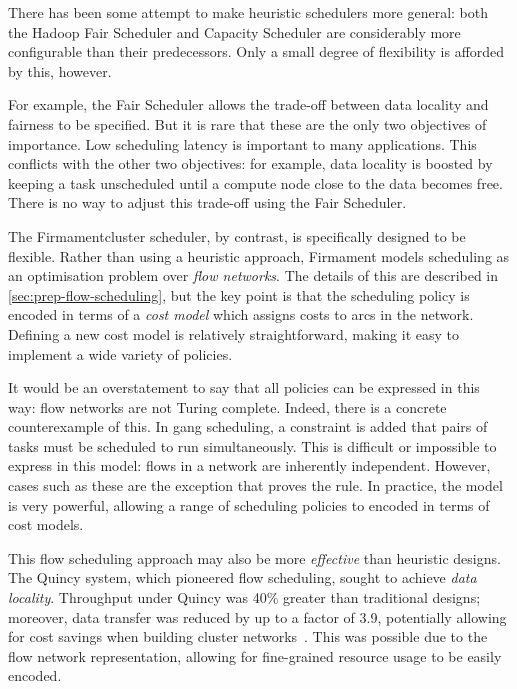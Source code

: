 There has been some attempt to make heuristic schedulers more general: both the Hadoop Fair Scheduler and Capacity Scheduler are considerably more configurable than their predecessors. Only a small degree of flexibility is afforded by this, however. 

For example, the Fair Scheduler allows the trade-off between data locality and fairness to be specified. But it is rare that these are the only two objectives of importance. Low scheduling latency is important to many applications. This conflicts with the other two objectives: for example, data locality is boosted by keeping a task unscheduled until a compute node close to the data becomes free. There is no way to adjust this trade-off using the Fair Scheduler.

The Firmament\footnotemark cluster scheduler, by contrast, is specifically designed to be flexible. Rather than using a heuristic approach, Firmament models scheduling as an optimisation problem over \emph{flow networks}. The details of this are described in \cref{sec:prep-flow-scheduling}, but the key point is that the scheduling policy is encoded in terms of a \emph{cost model} which assigns costs to arcs in the network. Defining a new cost model is relatively straightforward, making it easy to implement a wide variety of policies.

It would be an overstatement to say that all policies can be expressed in this way: flow networks are not Turing complete. Indeed, there is a concrete counterexample of this. In gang scheduling, a constraint is added that pairs of tasks must be scheduled to run simultaneously. This is difficult or impossible to express in this model: flows in a network are inherently independent. However, cases such as these are the exception that proves the rule. In practice, the model is very powerful, allowing a range of scheduling policies to encoded in terms of cost models. 

This flow scheduling approach may also be more \emph{effective} than heuristic designs. The Quincy system, which pioneered flow scheduling, sought to achieve \emph{data locality}. Throughput under Quincy was 40\% greater than traditional designs; moreover, data transfer was reduced by up to a factor of 3.9, potentially allowing for cost savings when building cluster networks~\cite{Isard:2009}. This was possible due to the flow network representation, allowing for fine-grained resource usage to be easily encoded. 

